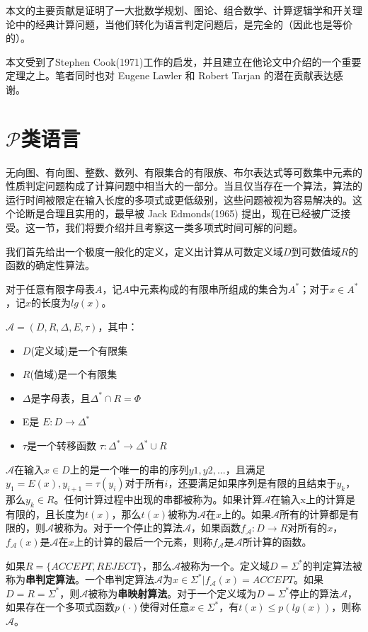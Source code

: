 \documentclass[twocolumn]{article}
\theoremstyle{nonumberplain}%
\begin{document}
\begin{CJK}{UTF8}{gbsn}
    本文的主要贡献是证明了一大批数学规划、图论、组合数学、计算逻辑学和开关理论中的经典计算问题，当他们转化为语言判定问题后，是完全的（因此也是等价的）。

    本文受到了Stephen Cook(1971)工作的启发，并且建立在他论文中介绍的一个重要定理之上。笔者同时也对 Eugene Lawler 和 Robert Tarjan 的潜在贡献表达感谢。

\section{$\mathcal{P}$类语言}
    无向图、有向图、整数、数列、有限集合的有限族、布尔表达式等可数集中元素的性质判定问题构成了计算问题中相当大的一部分。当且仅当存在一个算法，算法的运行时间被限定在输入长度的多项式或更低级别，这些问题被视为容易解决的。这个论断是合理且实用的，最早被 Jack Edmonds(1965) 提出，现在已经被广泛接受。这一节，我们将要介绍并且考察这一类多项式时间可解的问题。

    我们首先给出一个极度一般化的定义，定义出计算从可数定义域$D$到可数值域$R$的函数的确定性算法。

    对于任意有限字母表$A$，记$A$中元素构成的有限串所组成的集合为$A^*$；对于$x\in A^*$，记$x$的长度为$lg(x)$。

    {}$\mathcal{A}=(D,R,\Delta,E,\tau)$，其中：
    \begin{itemize}
    \item $D$(定义域)是一个有限集
    \item $R$(值域)是一个有限集
    \item $\Delta$是字母表，且$\Delta^*\cap R=\Phi$
    \item E是{} $E:D\rightarrow\Delta^*$
    \item $\tau$是一个转移函数 $\tau:\Delta^*\rightarrow\Delta^*\cup R$
    \end{itemize}

    $\mathcal{A}$在输入$x\in D$上的{}是一个唯一的串的序列$y1,y2,...$，且满足$y_1=E(x),y_{i+1}=\tau(y_i)$对于所有$i$，还要满足如果序列是有限的且结束于$y_k$，那么$y_k\in R$。任何计算过程中出现的串都被称为{}。如果计算$\mathcal{A}$在输入x上的计算是有限的，且长度为$t(x)$，那么$t(x)$被称为$\mathcal{A}$在$x$上的{}。如果$\mathcal{A}$所有的计算都是有限的，则$\mathcal{A}$被称为{}。对于一个停止的算法$\mathcal{A}$，如果函数$f_\mathcal{A}:D\rightarrow R$对所有的$x$，$f_\mathcal{A}(x)$是$\mathcal{A}$在$x$上的计算的最后一个元素，则称$f_\mathcal{A}$是$\mathcal{A}$所计算的函数。

    如果$R=\{ACCEPT,REJECT\}$，那么$\mathcal{A}$被称为一个{}。定义域$D=\Sigma^*$的判定算法被称为{\bf 串判定算法}。一个串判定算法$\mathcal{A}${}为${x\in\Sigma^*|f_\mathcal{A}(x)=ACCEPT}$。如果$D=R=\Sigma^*$，则$\mathcal{A}$被称为{\bf 串映射算法}。对于一个定义域为$D=\Sigma^*$停止的算法$\mathcal{A}$，如果存在一个多项式函数$p(\cdot)$使得对任意$x\in\Sigma^*$，有$t(x)\le p(lg(x))$，则称$\mathcal{A}${}。


\end{CJK}
\end{document}
